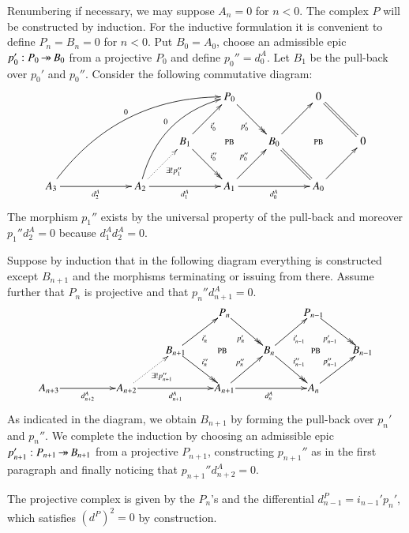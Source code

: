 \documentclass[1p]{elsarticle}
\makeatletter
\renewenvironment{proof}[1][\proofname]{\par
  \pushQED{\qed}%
  \normalfont \topsep6\p@\@plus6\p@\relax
  \trivlist
  \item[\hskip\labelsep
        \scshape
    #1\@addpunct{.}]\ignorespaces
}{%
  \popQED\endtrivlist\@endpefalse
}
\theoremstyle{mythm}
\theoremstyle{mydef}
\makeatother
\begin{document}
\begin{proof}
  Renumbering if necessary, we may suppose $A_n = 0$ for $n < 0$. The
  complex $P$ will be constructed by induction. For the inductive formulation
  it is convenient to define $P_{n} = B_{n} = 0$ for $n < 0$. Put $B_0 = A_0$,
  choose an admissible epic $p_{0}': P_{0} \operatorname{\twoheadrightarrow} B_0$ from a projective
  $P_0$ and define
  $p_{0}'' = d^{A}_0$. Let $B_1$ be the pull-back over $p_{0}'$
  and $p_{0}''$. Consider the following commutative diagram:
  \[
  \xymatrix@!{
    & & & & P_{0} \ar@{->>}[dr]_{p_{0}'} & & 0 \ar@{=}[dr] \\
    & & &
    B_{1} \ar@{->>}[dr]^{i_{0}''} \ar[ur]_{i_{0}'} \ar@{}[rr]|{\text{PB}} & & 
    B_{0} \ar@{=}[dr] \ar[ur] \ar@{}[rr]|{\text{PB}} & &
    0 \\
    A_{3} \ar[rr]_{d^{A}_2} \ar@/^+2pc/[uurrrr]^{0} & &
    A_{2} \ar[rr]_{d^{A}_1} \ar@/^+1.5pc/[uurr]^{0} 
    \ar@{.>}[ur]_{\exists!p_{1}''} & & 
    A_{1} \ar[rr]_{d^{A}_0} \ar[ur]^{p_{0}''}& & 
    A_{0} \ar[ur]
  }
  \]
  The morphism $p_{1}''$ exists by the universal property of the pull-back
  and moreover $p_{1}''d^{A}_2 = 0$ because $d^{A}_1 d^{A}_2 = 0$.

  Suppose by induction that in the following diagram everything is constructed
  except $B_{n+1}$ and the morphisms terminating or issuing from there.
  Assume further that $P_n$ is projective and that $p_{n}''d^{A}_{n+1} = 0$.
  \[
  \xymatrix@1{
    & & & & P_{n} \ar@{->>}[dr]_{p_{n}'} & & P_{n-1} \ar@{->>}[dr]_{p_{n-1}'}
    \\
    & & &
    B_{n+1} \ar@{->>}[dr]^{i_{n}''} \ar[ur]_{i_{n}'} 
    \ar@{}[rr]|{\text{PB}} & & 
    B_{n} \ar@{->>}[dr]^{i_{n-1}''} \ar[ur]_{i_{n-1}'}
    \ar@{}[rr]|{\text{PB}} & &
    B_{n-1} \\
    A_{n+3} \ar[rr]_{d^{A}_{n+2}} & & 
    A_{n+2} \ar[rr]_{d^{A}_{n+1}} 
    \ar@{.>}[ur]_{\exists!p_{n+1}''} & & 
    A_{n+1} \ar[rr]_{d^{A}_{n}} \ar[ur]^{p_{n}''}& & 
    A_{n} \ar[ur]^{p_{n-1}''}
  }
  \]
  As indicated in the diagram, we obtain $B_{n+1}$ by forming the pull-back
  over $p_{n}'$ and $p_{n}''$. We complete the induction by choosing
  an admissible epic $p_{n+1}' : P_{n+1} \operatorname{\twoheadrightarrow} B_{n+1}$ from a projective
  $P_{n+1}$,
  constructing $p_{n+1}''$ as in the first paragraph and finally noticing that
  $p_{n+1}''d^{A}_{n+2} = 0$.

  The projective complex is given by the $P_n$'s and the
  differential $d^{P}_{n-1} = i_{n-1}' p_{n}'$, which satisfies
  $(d^{P})^2 = 0$ by construction.


\end{proof}
\end{document}
